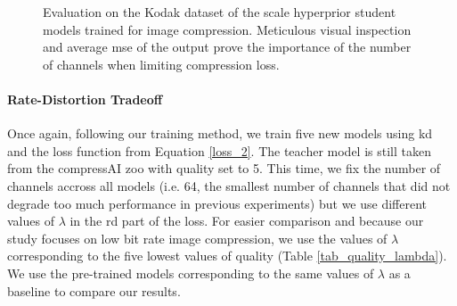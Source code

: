\documentclass{article}
\begin{document}
\begin{figure}[H]
    \centering
    \qquad
    \caption[Evaluation on the Kodak dataset of the scale hyperprior student models trained for image compression.]{Evaluation on the Kodak dataset of the scale hyperprior student models trained for image compression. Meticulous visual inspection and average \acrshort{mse} of the output prove the importance of the number of channels when limiting compression loss.}
    \label{kd_lic_2}
\end{figure}

\paragraph{Rate-Distortion Tradeoff}
Once again, following our training method, we train five new models using \acrshort{kd} and the loss function from Equation \ref{loss_2}. The teacher model is still taken from the compressAI zoo with \textsf{quality} set to 5. This time, we fix the number of channels accross all models (i.e. 64, the smallest number of channels that did not degrade too much performance in previous experiments) but we use different values of \(\lambda\) in the \acrshort{rd} part of the loss. For easier comparison and because our study focuses on low bit rate image compression, we use the values of \(\lambda\) corresponding to the five lowest values of \textsf{quality} (Table \ref{tab_quality_lambda}). We use the pre-trained models corresponding to the same values of \(\lambda\) as a baseline to compare our results.
\end{document}
